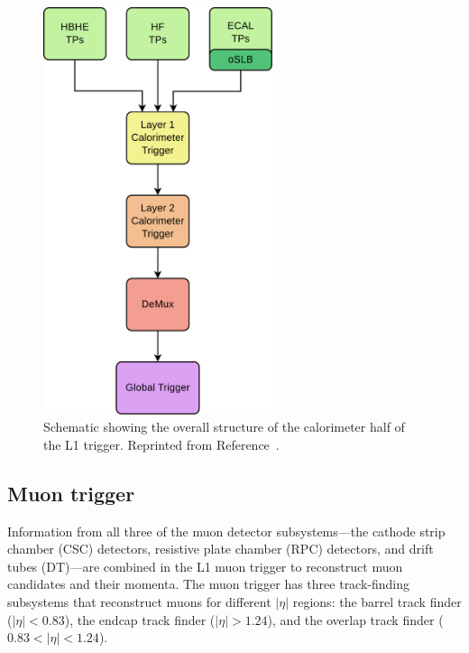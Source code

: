 \begin{figure}[h]
\begin{center}
\includegraphics[width=0.6\textwidth]{Figures/Trigger/caloL1T.pdf}
\end{center}
\caption[Schematic showing the overall structure of the calorimeter half of the L1 trigger.]
{Schematic showing the overall structure of the calorimeter half of the L1 trigger. Reprinted from Reference~\cite{L1twiki}.}
\label{fig:caloL1T}
\end{figure}


\subsection{Muon trigger}
Information from all three of the muon detector subsystems---the cathode strip chamber (CSC) detectors, resistive plate chamber (RPC) detectors, and drift tubes (DT)---are combined in the L1 muon trigger to reconstruct muon candidates and their momenta. The muon trigger has three track-finding subsystems that reconstruct muons for different $|\eta|$ regions: the barrel track finder ($|\eta| < 0.83$), the endcap track finder ($|\eta| > 1.24$), and the overlap track finder ($0.83 < |\eta| < 1.24$).

